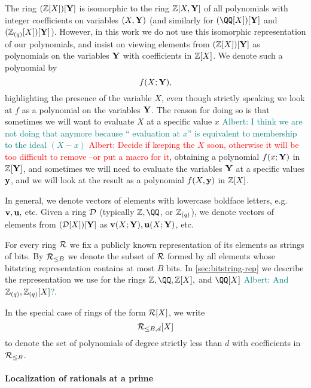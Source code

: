 \documentclass[11pt,letterpaper,usenames,dvipsnames]{article}
\newcommand{\albert}[1]{\textcolor{teal}{Albert: {#1}}}
\newcommand{\alberturgent}[1]{\textcolor{red}{Albert: {#1}}}
\begin{document}
The ring $(\mathbb{Z}[X])[\mathbf{Y}]$ is isomorphic to the ring $\mathbb{Z}[X, \mathbf{Y}]$ of all polynomials with integer coefficients on variables $(X,\mathbf{Y})$  (and similarly for $(\QQ[X])[\YY]$ and $(\mathbb{Z}_{(q)}[X])[\mathbf{Y}]$). However, in this work we do not use this isomorphic representation of our polynomials, and insist on viewing elements from $(\mathbb{Z}[X])[\mathbf{Y}]$ as polynomials on the variables $\mathbf{Y}$ with coefficients in $\mathbb{Z}[X]$. We denote such a polynomial by $$f(X;\mathbf{Y}),$$
highlighting the presence of the variable $X$, even though strictly speaking we look at $f$ as a polynomial on the variables $\mathbf{Y}$. The reason for doing so is that sometimes we will want to evaluate $X$ at a specific value $x$ \albert{I think we are not doing that anymore because `` evaluation at $x$'' is equivalent to membership to the ideal $(X-x)$} \alberturgent{Decide if keeping the $X$ soon, otherwise it will be too difficult to remove --or put a macro for it}, obtaining a polynomial $f(x;\mathbf{Y})$ in $\mathbb{Z}[\mathbf{Y}]$, and sometimes we will need to evaluate the variables $\mathbf{Y}$ at a specific values $\mathbf{y}$, and we will look at the result as  a polynomial $f(X,\mathbf{y})$ in $\mathbb{Z}[X]$. 

In general, we denote vectors of elements with lowercase boldface letters, e.g.\ $\mathbf{v},\mathbf{u},$ etc. Given a ring $\mathcal{D}$ (typically $\ZZ, \QQ$, or $\mathbb{Z}_{(q)}$), we denote vectors of elements from $(\mathcal{D}[X])[\mathbf{Y}]$ as $\mathbf{v}(X;\mathbf{Y}), \mathbf{u}(X;\mathbf{Y})$, etc.


For every ring $\mathcal{R}$  we fix a publicly known representation of its elements as strings of bits. By $\mathcal{R}_{\leq B}$ we denote the subset of $\mathcal{R}$ formed by all elements whose bitstring representation contains at most $B$ bits. In \cref{sec:bitstring-rep} we describe the representation we use for the rings $\ZZ,\QQ, \ZZ[X],$ and $\QQ[X]$ \albert{And $\mathbb{Z}_{(q)},\mathbb{Z}_{(q)}[X]$?}.

In the special case of rings of the form $\mathcal{R}[X]$, we write $$\mathcal{R}_{\leq B, d}[X]$$ to denote the set of polynomials of degree strictly less than $d$ with coefficients in $\mathcal{R}_{\leq B}$.

\paragraph{Localization of rationals at a prime}
\label{sec:local-rings}
\end{document}
